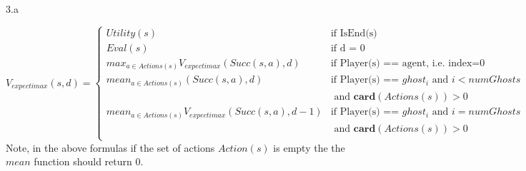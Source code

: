 \LARGE
3.a
\normalsize

\begin{answer}

\begin{equation*}
  V_{expectimax}(s, d) =
    \begin{cases}
      Utility(s) & \text{if IsEnd(s)}\\
      Eval(s) & \text{if d = 0}\\
      max_{a \in Actions(s)} V_{expectimax} (Succ(s, a), d)      &  \text{if Player(s) == agent, i.e. index=0} \\
      mean_{a \in Actions(s)}  (Succ(s, a), d)       &   \text{if Player(s) == $ghost_i$ and $i < numGhosts$} \\
                                                                            &  \text { and $\mathbf{card}(Actions(s)) > 0$ }\\
      mean_{a \in Actions(s)} V_{expectimax} (Succ(s, a), d-1)    &   \text{if Player(s) == $ghost_i$ and $i = numGhosts$} \\
                                                                           & \text{ and $\mathbf{card}(Actions(s)) > 0$ } \\
    \end{cases}       
\end{equation*}
Note, in the above formulas if the set of actions $Action(s)$ is empty the the $mean$ function should return $0$.

\end{answer}
\clearpage



